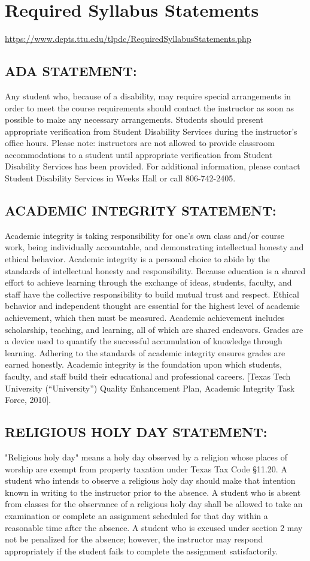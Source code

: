 \documentclass[12pt]{article}
\begin{document}
\section*{Required Syllabus Statements}
\url{https://www.depts.ttu.edu/tlpdc/RequiredSyllabusStatements.php}
\subsection*{ADA STATEMENT:}
Any student who, because of a disability, may require special arrangements in order to meet the course requirements should contact the instructor as soon as possible to make any necessary arrangements. Students should present appropriate verification from Student Disability Services during the instructor's office hours. Please note: instructors are not allowed to provide classroom accommodations to a student until appropriate verification from Student Disability Services has been provided. For additional information, please contact Student Disability Services in Weeks Hall or call 806-742-2405.

\subsection*{ACADEMIC INTEGRITY STATEMENT:}
Academic integrity is taking responsibility for one's own class and/or course work, being individually accountable, and demonstrating intellectual honesty and ethical behavior. Academic integrity is a personal choice to abide by the standards of intellectual honesty and responsibility. Because education is a shared effort to achieve learning through the exchange of ideas, students, faculty, and staff have the collective responsibility to build mutual trust and respect. Ethical behavior and independent thought are essential for the highest level of academic achievement, which then must be measured. Academic achievement includes scholarship, teaching, and learning, all of which are shared endeavors. Grades are a device used to quantify the successful accumulation of knowledge through learning. Adhering to the standards of academic integrity ensures grades are earned honestly. Academic integrity is the foundation upon which students, faculty, and staff build their educational and professional careers. [Texas Tech University (“University”) Quality Enhancement Plan, Academic Integrity Task Force, 2010].


\subsection*{RELIGIOUS HOLY DAY STATEMENT:}
"Religious holy day" means a holy day observed by a religion whose places of worship are exempt from property taxation under Texas Tax Code §11.20. A student who intends to observe a religious holy day should make that intention known in writing to the instructor prior to the absence. A student who is absent from classes for the observance of a religious holy day shall be allowed to take an examination or complete an assignment scheduled for that day within a reasonable time after the absence. A student who is excused under section 2 may not be penalized for the absence; however, the instructor may respond appropriately if the student fails to complete the assignment satisfactorily.
\end{document}
